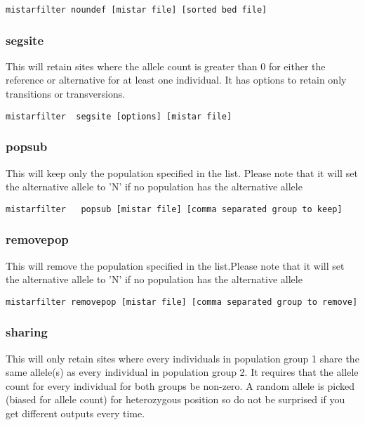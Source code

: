 \documentclass[a4paper]{article}
\begin{document}
\begin{verbatim}
mistarfilter noundef [mistar file] [sorted bed file]
\end{verbatim}

\subsubsection{segsite}

This will retain sites where the allele count is greater than 0 for either the reference or alternative for at least one individual. It has options to retain only transitions or transversions. 

\begin{verbatim}
mistarfilter  segsite [options] [mistar file]
\end{verbatim}

\subsubsection{popsub}

This will keep only the population specified in the list. Please note that it will set the alternative allele to 'N' if no population has the alternative allele

\begin{verbatim}
mistarfilter   popsub [mistar file] [comma separated group to keep]
\end{verbatim}

\subsubsection{removepop}

This will remove the population specified in the list.Please note that it will set the alternative allele to 'N' if no population has the alternative allele

\begin{verbatim}
mistarfilter removepop [mistar file] [comma separated group to remove]
\end{verbatim}

\subsubsection{sharing}

This will only retain sites where every individuals in population group 1 share the same allele(s) as every individual in population group 2.
It requires that the allele count for every individual for both groups be non-zero.
A random allele is picked (biased for allele count) for heterozygous position so do not be surprised if you get different outputs every time.
\end{document}
